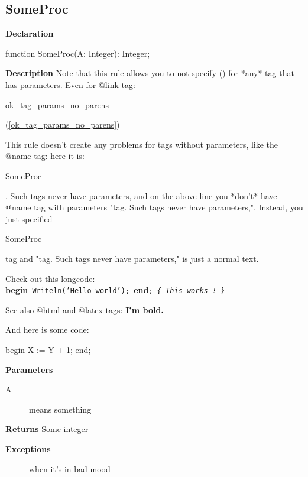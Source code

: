 \documentclass{report}
\begin{document}
\subsection*{SomeProc}
\begin{list}{}{
\setlength{\itemindent}{0cm}
\setlength{\listparindent}{0cm}
\setlength{\leftmargin}{\evensidemargin}
\addtolength{\leftmargin}{\tmplength}
\settowidth{\labelsep}{X}
\addtolength{\leftmargin}{\labelsep}
\setlength{\labelwidth}{\tmplength}
}
\begin{flushleft}
\item[\textbf{Declaration}\hfill]
\begin{ttfamily}
function SomeProc(A: Integer): Integer;\end{ttfamily}


\end{flushleft}
\par
\item[\textbf{Description}]
Note that this rule allows you to not specify () for *any* tag that has parameters. Even for @link tag: \begin{ttfamily}ok{\_}tag{\_}params{\_}no{\_}parens\end{ttfamily}(\ref{ok_tag_params_no_parens})

This rule doesn't create any problems for tags without parameters, like the @name tag: here it is: \begin{ttfamily}SomeProc\end{ttfamily}. Such tags never have parameters, and on the above line you *don't* have @name tag with parameters "tag. Such tags never have parameters,". Instead, you just specified \begin{ttfamily}SomeProc\end{ttfamily} tag and "tag. Such tags never have parameters," is just a normal text.

Check out this longcode: \texttt{}\textbf{begin}\texttt{~Writeln('Hello~world');~}\textbf{end}\texttt{;~\textit{{\{}~This~works~!~{\}}}\\
}

See also @html and @latex tags:  {\bf I'm bold.}

And here is some code: \begin{ttfamily}begin X := Y + 1; end;\end{ttfamily}

  \par
\item[\textbf{Parameters}]
\begin{description}
\item[A] means something
\end{description}
\item[\textbf{Returns}]Some integer
\item[\textbf{Exceptions}]
\begin{description}
\item[\begin{ttfamily}EFoo\end{ttfamily}(\ref{ok_tag_params_no_parens.EFoo})] when it's in bad mood
\end{description}


\end{list}
\end{document}

